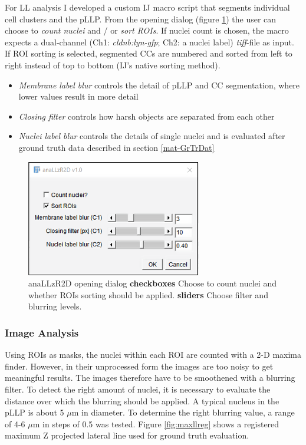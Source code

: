 \documentclass[10pt, b5paper, singlespacinge, twoside]{reedthesis} %
\providecommand{\tightlist}{%
  \setlength{\itemsep}{0pt}\setlength{\parskip}{0pt}}
\theoremstyle{definition}
\theoremstyle{definition}
\theoremstyle{definition}
\theoremstyle{remark}
\begin{document}
For LL analysis I developed a custom IJ macro script that segments individual cell clusters and the pLLP. From the opening dialog (figure \ref{fig:anallzr2ddialog}) the user can choose to \emph{count nuclei} and / or \emph{sort ROIs}. If nuclei count is chosen, the macro expects a dual-channel (Ch1: \emph{cldnb:lyn-gfp}; Ch2: a nuclei label) \emph{tiff}-file as input. If ROI sorting is selected, segmented CCs are numbered and sorted from left to right instead of top to bottom (IJ's native sorting method).
\begin{itemize}
\tightlist
\item
  \emph{Membrane label blur} controls the detail of pLLP and CC segmentation, where lower values result in more detail
\item
  \emph{Closing filter} controls how harsh objects are separated from each other
\item
  \emph{Nuclei label blur} controls the details of single nuclei and is evaluated after ground truth data described in section \ref{mat-GrTrDat}
\end{itemize}

\begin{figure}[h]

{\centering \includegraphics[width=0.4\linewidth,]{figures/materials/macros/anallzr2D_macro} 

}

\caption[anaLLzR2D opening dialog]{anaLLzR2D opening dialog \textbf{checkboxes} Choose to count nuclei and whether ROIs sorting should be applied. \textbf{sliders} Choose filter and blurring levels.}\label{fig:anallzr2ddialog}
\end{figure}
\hypertarget{image-analysis}{%
\subsubsection{Image Analysis}\label{image-analysis}}

Using ROIs as masks, the nuclei within each ROI are counted with a 2-D maxima finder. However, in their unprocessed form the images are too noisy to get meaningful results. The images therefore have to be smoothened with a blurring filter. To detect the right amount of nuclei, it is necessary to evaluate the distance over which the blurring should be applied. A typical nucleus in the pLLP is about 5 \(\mu\)m in diameter. To determine the right blurring value, a range of 4-6 \(\mu\)m in steps of 0.5 was tested. Figure \ref{fig:maxllreg} shows a registered maximum Z projected lateral line used for ground truth evaluation.
\end{document}
